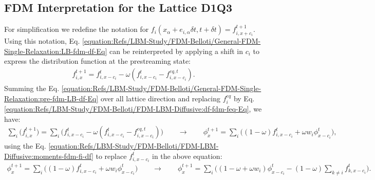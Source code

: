 \documentclass[letterpaper,10pt,english,openany,oneside]{jupyterBook}
\begin{document}
\subsection{FDM Interpretation for the Lattice D1Q3}
\label{\detokenize{Refs/LBM-Study/FDM-Belloti/FDM-LBM-Diffusive:fdm-interpretation-for-the-lattice-d1q3}}
\sphinxAtStartPar
For simplification we redefine the notation for \(f_i( x_{\alpha} + e_{i,\alpha} \delta t, t+\delta t)=f_{i,x+c_{i}}^{t+1}\). Using this notation, Eq. \eqref{equation:Refs/LBM-Study/FDM-Belloti/General-FDM-Single-Relaxation:LB-fdm-df-Eq} can be reinterpreted by applying a shift in \(c_i\) to express the distribution function at the pre\sphinxhyphen{}streaming state:
\begin{equation}\label{equation:Refs/LBM-Study/FDM-Belloti/FDM-LBM-Diffusive:pre-fdm-LB-df-Eq}
\begin{split}
f_{i,x}^{t+1}  = f_{i,x-c_{i}}^{t}  - \omega \left( f_{i,x-c_{i}}^{t} - f_{i,x-c_{i}}^{eq,t} \right).
\end{split}
\end{equation}
\sphinxAtStartPar
Summing the Eq. \eqref{equation:Refs/LBM-Study/FDM-Belloti/General-FDM-Single-Relaxation:pre-fdm-LB-df-Eq} over all lattice direction and replacing \(f_{i}^{eq}\) by Eq. \eqref{equation:Refs/LBM-Study/FDM-Belloti/FDM-LBM-Diffusive:df-fdm-feq-Eq}, we have:
\begin{equation*}
\begin{split}
\displaystyle\sum_{i}\Big( f_{i,x}^{t+1} \Big) = \displaystyle\sum_{i}\Big( f_{i,x-c_{i}}^{t}  - \omega \left( f_{i,x-c_{i}}^{t} - f_{i,x-c_{i}}^{eq,t} \right) \Big) \qquad \rightarrow  \qquad \phi_{x}^{t+1} = \displaystyle\sum_{i}\Big( (1-\omega) f_{i,x-c_{i}}^{t}  + \omega w_{i}\phi_{x-c_{i}}^{t} \Big),
\end{split}
\end{equation*}
\sphinxAtStartPar
using the Eq. \eqref{equation:Refs/LBM-Study/FDM-Belloti/FDM-LBM-Diffusive:moments-fdm-fi-df} to replace \(f_{i,x-c_{i}}^{t}\) in the above equation:
\begin{equation*}
\begin{split}
\phi_{x}^{t+1} = \displaystyle\sum_{i}\Big( (1-\omega) f_{i,x-c_{i}}^{t}  + \omega w_{i}\phi_{x-c_{i}}^{t} \Big) \qquad \rightarrow  \qquad \phi_{x}^{t+1} = \displaystyle\sum_{i}\Big( (1-\omega + \omega w_{i}) \phi_{x-c_{i}}^{t} - (1-\omega) \displaystyle\sum_{k\neq i} f_{k,x-c_{i}}^{t} \Big).
\end{split}
\end{equation*}
\sphinxAtStartPar
\end{document}

